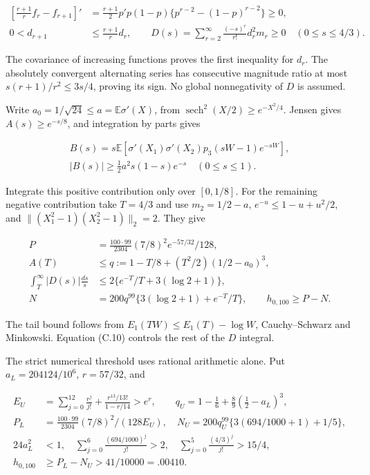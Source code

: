 \documentclass{article}
\begin{document}
\[
\begin{aligned}
\left[\frac{r+1}{r}f_r-f_{r+1}\right]'&=\frac{r+1}{2}p'p(1-p)\{p^{r-2}-(1-p)^{r-2}\}\ge0,\\
0<d_{r+1}&\le\frac{r+1}{r}d_r,\qquad
D(s)=\sum_{r=2}^\infty\frac{(-s)^r}{r!}d_r^2m_r\ge0\quad(0\le s\le4/3).
\end{aligned}
\tag{C.10}
\]

The covariance of increasing functions proves the first inequality for
\(d_r\). The absolutely convergent alternating series has consecutive
magnitude ratio at most \(s(r+1)/r^2\le3s/4\), proving its sign. No
global nonnegativity of \(D\) is assumed.

Write \(a_0=1/\sqrt{24}\le a=\mathbb E\sigma'(X)\), from
\(\operatorname{sech}^2(X/2)\ge e^{-X^2/4}\). Jensen gives
\(A(s)\ge e^{-s/8}\), and integration by parts gives

\[
\begin{gathered}
B(s)=s\mathbb E[\sigma'(X_1)\sigma'(X_2)p_3(sW-1)e^{-sW}],\\
|B(s)|\ge\tfrac12a^2s(1-s)e^{-s}\quad(0\le s\le1).
\end{gathered}
\tag{C.11}
\]

Integrate this positive contribution only over \([0,1/8]\). For the
remaining negative contribution take \(T=4/3\) and use \(m_2=1/2-a\),
\(e^{-u}\le1-u+u^2/2\), and \(\|(X_1^2-1)(X_2^2-1)\|_2=2\). They give

\[
\begin{aligned}
P&=\frac{100\cdot99}{2304}(7/8)^2e^{-57/32}/128,\\
A(T)&\le q:=1-T/8+(T^2/2)(1/2-a_0)^3,\\
\int_T^\infty|D(s)|\frac{ds}{s}&\le2\{e^{-T}/T+3(\log2+1)\},\\
N&=200q^{99}\{3(\log2+1)+e^{-T}/T\},\qquad h_{0,100}\ge P-N.
\end{aligned}
\tag{C.12}
\]

The tail bound follows from \(E_1(TW)\le E_1(T)-\log W\),
Cauchy--Schwarz and Minkowski. Equation (C.10) controls the rest of the
\(D\) integral.

The strict numerical threshold uses rational arithmetic alone. Put
\(a_L=204124/10^6\), \(r=57/32\), and

\[
\begin{aligned}
E_U&=\sum_{j=0}^{12}\frac{r^j}{j!}+\frac{r^{13}/13!}{1-r/14}>e^r,\qquad
q_U=1-\tfrac16+\tfrac89(\tfrac12-a_L)^3,\\
P_L&=\frac{100\cdot99}{2304}(7/8)^2/(128E_U),\quad
N_U=200q_U^{99}\{3(694/1000+1)+1/5\},\\
24a_L^2&<1,\quad\sum_{j=0}^{6}\frac{(694/1000)^j}{j!}>2,\quad
\sum_{j=0}^{5}\frac{(4/3)^j}{j!}>15/4,\\
h_{0,100}&\ge P_L-N_U>41/10000=.00410.
\end{aligned}
\tag{C.13}
\]
\end{document}
